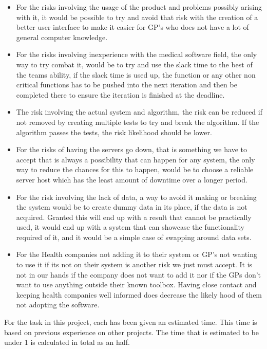 \begin{itemize}
	\item For the risks involving the usage of the product and problems possibly arising with it, it would be possible to try and avoid that risk with the creation of a better user interface to make it easier for GP’s who does not have a lot of general computer knowledge. 
	\item For the risks involving inexperience with the medical software field, the only way to try combat it, would be to try and use the slack time to the best of the teams ability, if the slack time is used up, the function or any other non critical functions has to be pushed into the next iteration and then be completed there to ensure the iteration is finished at the deadline.
	\item The risk involving the actual system and algorithm, the risk can be reduced if not removed by creating multiple tests to try and break the algorithm. If the algorithm passes the tests, the risk likelihood should be lower.
	\item For the risks of having the servers go down, that is something we have to accept that is always a possibility that can happen for any system, the only way to reduce the chances for this to happen, would be to choose a reliable server host which has the least amount of downtime over a longer period.
	\item For the risk involving the lack of data, a way to avoid it making or breaking the system would be to create dummy data in its place, if the data is not acquired. Granted this will end up with a result that cannot be practically used, it would end up with a system that can showcase the functionality required of it, and it would be a simple case of swapping around data sets.
	\item For the Health companies not adding it to their system or GP’s not wanting to use it if its not on their system is another risk we just must accept. It is not in our hands if the company does not want to add it nor if the GPs don’t want to use anything outside their known toolbox. Having close contact and keeping health companies well informed does decrease the likely hood of them not adopting the software.
\end{itemize}
\pagebreak
For the task in this project, each has been given an estimated time. This time is based on previous experience on other projects. The time that is estimated to be under 1 is calculated in total as an half.

